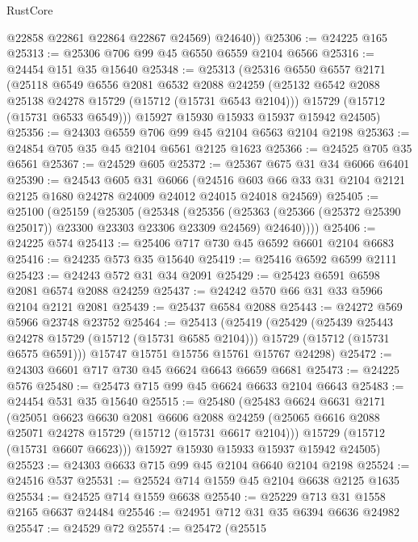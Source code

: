 \begin{lexlean}{RustCore}
\begin{coremodule}
          @22858
          @22861
          @22864
          @22867
          @24569)
        @24640))
@25306 := @24225 @165
@25313 := @25306 @706 @99 @45 @6550 @6559 @2104 @6566
@25316 := @24454 @151 @35 @15640
@25348 := @25313
    (@25316
      @6550
      @6557
      @2171
      (@25118
        @6549
        @6556
        @2081
        @6532
        @2088
        @24259
        (@25132 @6542 @2088 @25138 @24278 @15729 (@15712 (@15731 @6543 @2104)))
        @15729
        (@15712 (@15731 @6533 @6549)))
      @15927
      @15930
      @15933
      @15937
      @15942
      @24505)
@25356 := @24303 @6559 @706 @99 @45 @2104 @6563 @2104 @2198
@25363 := @24854 @705 @35 @45 @2104 @6561 @2125 @1623
@25366 := @24525 @705 @35 @6561
@25367 := @24529 @605
@25372 := @25367 @675 @31 @34 @6066 @6401
@25390 := @24543
    @605
    @31
    @6066
    (@24516 @603 @66 @33 @31 @2104 @2121 @2125 @1680 @24278 @24009 @24012 @24015 @24018 @24569)
@25405 := @25100
    (@25159
      (@25305
        (@25348
          (@25356
            (@25363 (@25366 (@25372 @25390 @25017)) @23300 @23303 @23306 @23309 @24569)
            @24640))))
@25406 := @24225 @574
@25413 := @25406 @717 @730 @45 @6592 @6601 @2104 @6683
@25416 := @24235 @573 @35 @15640
@25419 := @25416 @6592 @6599 @2111
@25423 := @24243 @572 @31 @34 @2091
@25429 := @25423 @6591 @6598 @2081 @6574 @2088 @24259
@25437 := @24242 @570 @66 @31 @33 @5966 @2104 @2121 @2081
@25439 := @25437 @6584 @2088
@25443 := @24272 @569 @5966 @23748 @23752
@25464 := @25413
    (@25419
      (@25429
        (@25439 @25443 @24278 @15729 (@15712 (@15731 @6585 @2104)))
        @15729
        (@15712 (@15731 @6575 @6591)))
      @15747
      @15751
      @15756
      @15761
      @15767
      @24298)
@25472 := @24303 @6601 @717 @730 @45 @6624 @6643 @6659 @6681
@25473 := @24225 @576
@25480 := @25473 @715 @99 @45 @6624 @6633 @2104 @6643
@25483 := @24454 @531 @35 @15640
@25515 := @25480
    (@25483
      @6624
      @6631
      @2171
      (@25051
        @6623
        @6630
        @2081
        @6606
        @2088
        @24259
        (@25065 @6616 @2088 @25071 @24278 @15729 (@15712 (@15731 @6617 @2104)))
        @15729
        (@15712 (@15731 @6607 @6623)))
      @15927
      @15930
      @15933
      @15937
      @15942
      @24505)
@25523 := @24303 @6633 @715 @99 @45 @2104 @6640 @2104 @2198
@25524 := @24516 @537
@25531 := @25524 @714 @1559 @45 @2104 @6638 @2125 @1635
@25534 := @24525 @714 @1559 @6638
@25540 := @25229 @713 @31 @1558 @2165 @6637 @24484
@25546 := @24951 @712 @31 @35 @6394 @6636 @24982
@25547 := @24529 @72
@25574 := @25472
    (@25515

\end{coremodule}
\end{lexlean}
